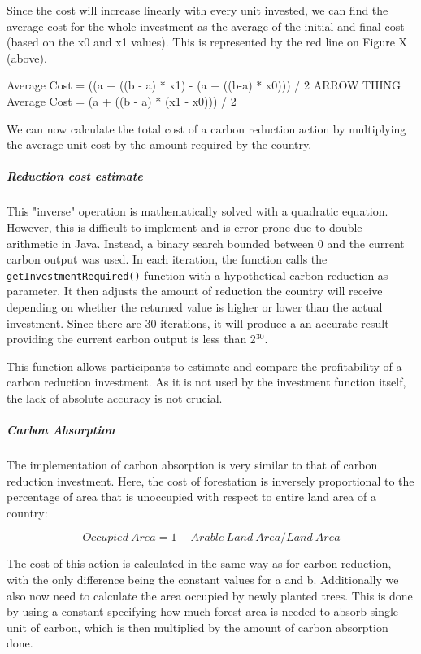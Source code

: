 %
%

Since the cost will increase linearly with every unit invested, we can find the average cost for the whole investment as the average of the initial and final cost (based on the x0 and x1 values). This is represented by the red line on Figure X (above).
 
\begin{center}
Average Cost = ((a + ((b - a) * x1) - (a + ((b-a) * x0))) / 2
ARROW THING Average  Cost = (a + ((b - a) * (x1 - x0))) / 2
\end{center}

We can now calculate the total cost of a carbon reduction action by multiplying the average unit cost by the amount required by the country.

\subparagraph{Reduction cost estimate}

This "inverse" operation is mathematically solved with a quadratic equation. However, this is difficult to implement and is error-prone due to double arithmetic in Java. Instead, a binary search bounded between 0 and the current carbon output was used. In each iteration, the function calls the \texttt{getInvestmentRequired()} function with a hypothetical carbon reduction as parameter. It then adjusts the amount of reduction the country will receive depending on whether the returned value is higher or lower than the actual investment. Since there are 30 iterations, it will produce a an accurate result providing the current carbon output is less than 2$^{30}$.
  
This function allows participants to estimate and compare the profitability of a carbon reduction investment. As it is not used by the investment function itself, the lack of absolute accuracy is not crucial.

\subparagraph{Carbon Absorption}

The implementation of carbon absorption is very similar to that of carbon reduction investment. Here, the cost of forestation is inversely proportional to the percentage of area that is unoccupied with respect to entire land area of a country:

$$
Occupied~Area= 1 - Arable~Land~Area / Land~Area
$$

The cost of this action is calculated in the same way as for carbon reduction, with the only difference being the constant values for a and b. Additionally we also now need to calculate the area occupied by newly planted trees. This is done by using a constant specifying how much forest area is needed to absorb single unit of carbon, which is then multiplied by the amount of carbon absorption done.

